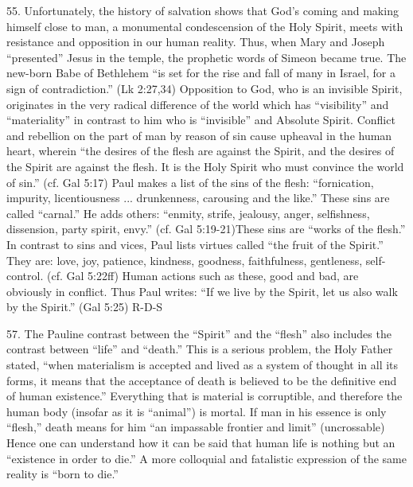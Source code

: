 \documentclass[oneside]{book}
\begin{document}
55. Unfortunately, the history of salvation shows that God's coming and making
himself close to man, a monumental condescension of the Holy Spirit, meets with
resistance and opposition in our human reality. Thus, when Mary and Joseph
``presented'' Jesus in the temple, the prophetic words of Simeon became
true. The new-born Babe of Bethlehem ``is set for the rise and fall of many in
Israel, for a sign of contradiction.'' (Lk 2:27,34) Opposition to God, who is an
invisible Spirit, originates in the very radical difference of the world which
has ``visibility'' and ``materiality'' in contrast to him who is ``invisible''
and Absolute Spirit. Conflict and rebellion on the part of man by reason of sin
cause upheaval in the human heart, wherein ``the desires of the flesh are
against the Spirit, and the desires of the Spirit are against the flesh. It is
the Holy Spirit who must convince the world of sin.'' (cf. Gal 5:17) Paul makes
a list of the sins of the flesh: ``fornication, impurity, licentiousness
... drunkenness, carousing and the like.'' These sins are called ``carnal.'' He
adds others: ``enmity, strife, jealousy, anger, selfishness, dissension, party
spirit, envy.'' (cf. Gal 5:19-21)These sins are ``works of the flesh.'' In
contrast to sins and vices, Paul lists virtues called ``the fruit of the
Spirit.'' They are: love, joy, patience, kindness, goodness, faithfulness,
gentleness, self-control. (cf. Gal 5:22ff) Human actions such as these, good and
bad, are obviously in conflict. Thus Paul writes: ``If we live by the Spirit,
let us also walk by the Spirit.'' (Gal 5:25)
R-D-S

57. The Pauline contrast between the ``Spirit'' and the ``flesh'' also includes
the contrast between ``life'' and ``death.'' This is a serious problem, the Holy
Father stated, ``when materialism is accepted and lived as a system of thought
in all its forms, it means that the acceptance of death is believed to be the
definitive end of human existence.'' Everything that is material is corruptible,
and therefore the human body (insofar as it is ``animal'') is mortal. If man in
his essence is only ``flesh,'' death means for him ``an impassable frontier and
limit'' (uncrossable) Hence one can understand how it can be said that human
life is nothing but an ``existence in order to die.'' A more colloquial and
fatalistic expression of the same reality is ``born to die.''
\end{document}

